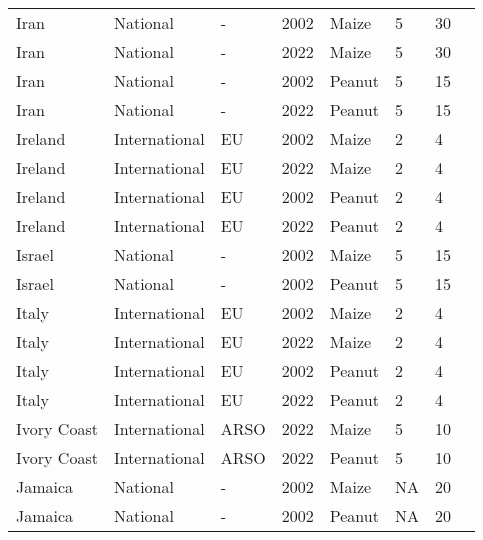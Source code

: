 \begin{landscape}
\begin{longtable}[c]{llllllll}
Iran              & National      & -        & 2002 & Maize  & 5  & 30 & \citet{van2004worldwide}     \\
Iran              & National      & -        & 2022 & Maize  & 5  & 30 & \citet{ISIRI2002}            \\
Iran              & National      & -        & 2002 & Peanut & 5  & 15 & \citet{van2004worldwide}     \\
Iran              & National      & -        & 2022 & Peanut & 5  & 15 & \citet{ISIRI2002}            \\
Ireland           & International & EU       & 2002 & Maize  & 2  & 4  & \citet{EC2010}               \\
Ireland           & International & EU       & 2022 & Maize  & 2  & 4  & \citet{EC2010}               \\
Ireland           & International & EU       & 2002 & Peanut & 2  & 4  & \citet{EC2010}               \\
Ireland           & International & EU       & 2022 & Peanut & 2  & 4  & \citet{EC2010}               \\
Israel            & National      & -        & 2002 & Maize  & 5  & 15 & \citet{van2004worldwide}     \\
Israel            & National      & -        & 2002 & Peanut & 5  & 15 & \citet{van2004worldwide}     \\
Italy             & International & EU       & 2002 & Maize  & 2  & 4  & \citet{EC2010}               \\
Italy             & International & EU       & 2022 & Maize  & 2  & 4  & \citet{EC2010}               \\
Italy             & International & EU       & 2002 & Peanut & 2  & 4  & \citet{EC2010}               \\
Italy             & International & EU       & 2022 & Peanut & 2  & 4  & \citet{EC2010}               \\
Ivory Coast       & International & ARSO     & 2022 & Maize  & 5  & 10 & \citet{ARSO2022}             \\
Ivory Coast       & International & ARSO     & 2022 & Peanut & 5  & 10 & \citet{ARSO2022}             \\
Jamaica           & National      & -        & 2002 & Maize  & NA & 20 & \citet{van2004worldwide}     \\
Jamaica           & National      & -        & 2002 & Peanut & NA & 20 & \citet{van2004worldwide}     \\

\end{longtable}
\end{landscape}
